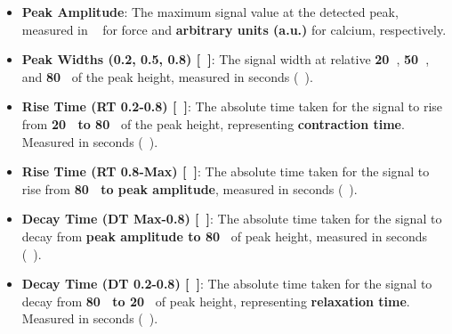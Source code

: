 \documentclass{report}
\begin{document}
            \begin{itemize}
                \item \textbf{Peak Amplitude}: The maximum signal value at the detected peak, measured in \SI{}{\textbf{\milli\newton}}
 for force and \textbf{arbitrary units (a.u.)} for calcium, respectively.
                \item \textbf{Peak Widths (0.2, 0.5, 0.8) [\SI{}{\textbf{\s}}]}: The signal width at relative \textbf{20\SI{}{\textbf{\percent}}}, \textbf{50\SI{}{\textbf{\percent}}}, and \textbf{80\SI{}{\textbf{\percent}}} of the peak height, measured in seconds (\SI{}{\textbf{\s}}).
                \item \textbf{Rise Time (RT 0.2-0.8) [\SI{}{\textbf{\s}}]}: The absolute time taken for the signal to rise from \textbf{20\SI{}{\textbf{\percent}} to 80\SI{}{\textbf{\percent}}} of the peak height, representing \textbf{contraction time}. Measured in seconds (\SI{}{\textbf{\s}}).
                \item \textbf{Rise Time (RT 0.8-Max) [\SI{}{\textbf{\s}}]}: The absolute time taken for the signal to rise from \textbf{80\SI{}{\textbf{\percent}} to peak amplitude}, measured in seconds (\SI{}{\textbf{\s}}).
                \item \textbf{Decay Time (DT Max-0.8) [\SI{}{\textbf{\s}}]}: The absolute time taken for the signal to decay from \textbf{peak amplitude to 80\SI{}{\textbf{\percent}}} of peak height, measured in seconds (\SI{}{\textbf{\s}}).
                \item \textbf{Decay Time (DT 0.2-0.8) [\SI{}{\textbf{\s}}]}: The absolute time taken for the signal to decay from \textbf{80\SI{}{\textbf{\percent}} to 20\SI{}{\textbf{\percent}}} of peak height, representing \textbf{relaxation time}. Measured in seconds (\SI{}{\textbf{\s}}).
            \end{itemize}
\end{document}
